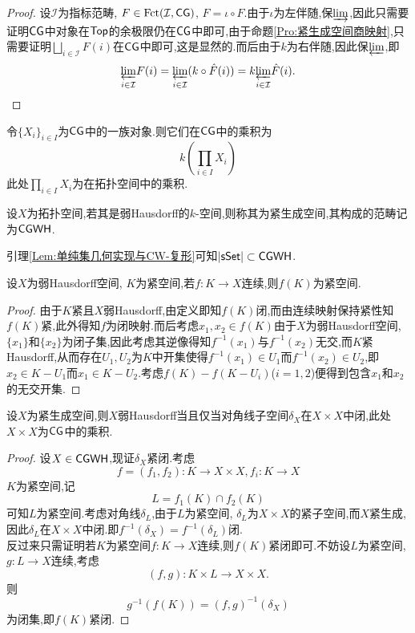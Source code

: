 \begin{proof}
    设$\mathcal{I}$为指标范畴, $F \in \operatorname{Fct}(\mathcal{I},\mathsf{CG})$, $\hat{F} = \iota \circ F$.由于$\iota$为左伴随,保$\underrightarrow{\lim}$,因此只需要证明$\mathsf{CG}$中对象在$\mathsf{Top}$的余极限仍在$\mathsf{CG}$中即可,由于命题\ref{Pro:紧生成空间商映射},只需要证明$\bigsqcup_{i\in \mathcal{I}}F(i)$在$\mathsf{CG}$中即可,这是显然的.而后由于$k$为右伴随,因此保$\underleftarrow{\lim}$,即
    \[
    \underset{i\in \mathcal{I}}{\underleftarrow{\lim}} F(i) = \underset{i\in \mathcal{I}}{\underleftarrow{\lim}} (k\circ \hat{F}(i)) = k \underset{i\in \mathcal{I}}{\underleftarrow{\lim}} \hat{F}(i).
    \]
\end{proof}
\begin{corollary}
    令$\{X_i\}_{i\in I}$为$\mathsf{CG}$中的一族对象.则它们在$\mathsf{CG}$中的乘积为
    \[
     k(\prod_{i\in I}X_i)
    \]
    此处$\prod_{i\in I}X_i$为在拓扑空间中的乘积.
\end{corollary}
\begin{definition}[紧生成弱Hausdorff空间]\label{Def:紧生成弱Hausdorff空间}
    设$X$为拓扑空间,若其是弱Hausdorff的$k$-空间,则称其为紧生成空间,其构成的范畴记为$\mathsf{CGWH}$.
\end{definition}
\begin{example}
    引理\ref{Lem:单纯集几何实现与CW-复形}可知$|\mathsf{sSet}| \subset \mathsf{CGWH}$.
\end{example}
\begin{proposition}
    设$X$为弱Hausdorff空间, $K$为紧空间,若$f : K \to X$连续,则$f(K)$为紧空间.
\end{proposition}
\begin{proof}
    由于$K$紧且$X$弱Hausdorff,由定义即知$f(K)$闭,而由连续映射保持紧性知$f(K)$紧,此外得知$f$为闭映射.而后考虑$x_1,x_2 \in f(K)$由于$X$为弱Hausdorff空间, $\{x_1\}$和$\{x_2\}$为闭子集,因此考虑其逆像得知$f^{-1}(x_1)$与$f^{-1}(x_2)$无交,而$K$紧Hausdorff,从而存在$U_1,U_2$为$K$中开集使得$f^{-1}(x_1)\in U_1$而$f^{-1}(x_2)\in U_2$,即$x_2\in K-U_1$而$x_1 \in K-U_2$.考虑$f(K) - f(K-U_i)$($i=1,2$)便得到包含$x_1$和$x_2$的无交开集.
\end{proof}
\begin{proposition}
    设$X$为紧生成空间,则$X$弱Hausdorff当且仅当对角线子空间$\delta_X$在$X\times X$中闭,此处$X \times X$为$\mathsf{CG}$中的乘积.
\end{proposition}
\begin{proof}
    设$X \in  \mathsf{CGWH}$,现证$\delta_X$紧闭.考虑
    \[
    f=(f_1,f_2) : K \to X\times X, f_i : K \to X
    \]
    $K$为紧空间,记
    \[
    L = f_1(K) \cap f_2(K)
    \]
    可知$L$为紧空间.考虑对角线$\delta_L$,由于$L$为紧空间, $\delta_L$为$X\times X$的紧子空间,而$X$紧生成,因此$\delta_L$在$X\times X$中闭.即$f^{-1}(\delta_X) = f^{-1}(\delta_L)$闭.\\
    反过来只需证明若$K$为紧空间$f: K\to X$连续,则$f(K)$紧闭即可.不妨设$L$为紧空间, $g: L \to X$连续,考虑
    \[
    (f,g): K \times L \to X\times X.
    \]
    则
    \[
    g^{-1}(f(K)) = (f,g)^{-1}(\delta_X)
    \]
    为闭集,即$f(K)$紧闭.
\end{proof}
